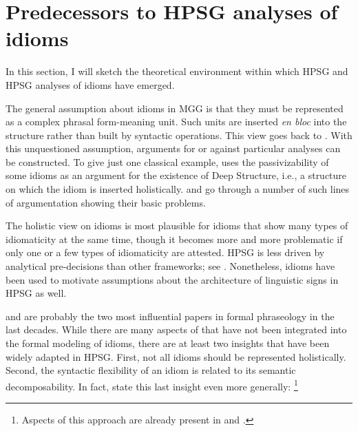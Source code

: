 \documentclass[output=paper,biblatex,babelshorthands,newtxmath,draftmode,colorlinks,citecolor=brown]{langscibook}
\begin{document}



\section{Predecessors to HPSG analyses of idioms}
\label{Sec-Predecessors}


In this section, I will sketch the theoretical environment within which HPSG and HPSG analyses of idioms have emerged.

The general assumption about idioms in MGG is that they
must be represented as a complex phrasal form-meaning unit. 
Such units are inserted \emph{en bloc} into the structure rather than built by syntactic operations.
This view goes back to \citet[]{Chomsky:65}. 
With this unquestioned assumption, arguments for or against particular analyses can be constructed. 
To give just one classical example, \citet[]{Chomsky81a} uses the passivizability of some idioms as an argument for the existence of Deep Structure, i.e., a structure on which the idiom is inserted holistically. 
%
\citet{Ruwet:91} and \citet{NSW94a} go through a number of such lines of argumentation showing their basic problems. 

The holistic view on idioms is most plausible for idioms that show many types of idiomaticity at the same time, though it becomes more and more problematic if only one or a few types of idiomaticity are attested.
HPSG is less driven by analytical pre-decisions than other frameworks; see
. Nonetheless, idioms have been used to motivate assumptions about the architecture of linguistic signs in HPSG as well.

\citet{WSN84a-u} and \citet{NSW94a} are probably the two most influential papers in formal phraseology in the last decades. 
While there are many aspects of \citet{NSW94a} that have not been integrated into the formal modeling of idioms, 
there are at least two insights that have been widely adapted in HPSG.
First, not all idioms should be represented holistically. 
Second, the syntactic flexibility of an idiom is related to its semantic decomposability. 
In fact, \citet{NSW94a} state this last insight even more generally:%
\footnote{Aspects of this approach are already present in \citet{Higgins:74} and \citet{Newmeyer:74}.}
\end{document}
